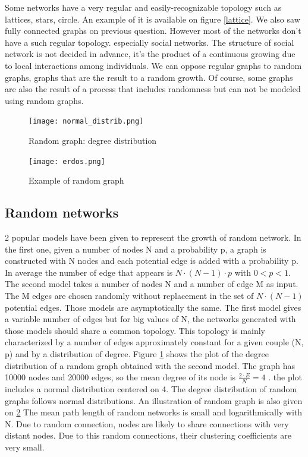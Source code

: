 \documentclass[a4paper, 12pt]{report}
\begin{document}
Some networks have a very regular and easily-recognizable topology such as lattices, stars, circle. An example of it is available on figure \ref{lattice}. We also saw fully connected graphs on previous question. However most of the networks don't have a such regular topology. especially social networks. The structure of social network is not decided in advance, it's the product of a continuous growing due to local interactions among individuals. We can oppose regular graphs to random graphs, graphs that are the result to a random growth. Of course, some graphs are also the result of a process that includes randomness but can not be modeled using random graphs.\\

\begin{figure}
\centering
\texttt{[image: normal\_distrib.png]}
\caption{Random graph: degree distribution}
\label{random}
\end{figure}

\begin{figure}
\centering
\texttt{[image: erdos.png]}
\caption{Example of random graph\citep{erdos_image}}
\label{erdos}
\end{figure}

\subsection{Random networks}
2 popular models have been given to represent the growth of random network. In the first one, given a number of nodes N and a probability p, a graph is constructed with N nodes and each potential edge is added with a probability p. In average the number of edge that appears is $N \cdot (N-1) \cdot p$ with $ 0< p <1$. The second model takes a number of nodes N and a number of edge M as input. The M edges are chosen randomly without replacement in the set of $N \cdot (N-1)$ potential edges. Those models are asymptotically the same. The first model gives a variable number of edges but for big values of N, the networks generated with those models should share a common topology. This topology is mainly characterized by a number of edges approximately constant for a given couple (N, p) and by a distribution of degree. Figure \ref{random} shows the plot of the degree distribution of a random graph obtained with the second model. The graph has 10000 nodes and 20000 edges, so the mean degree of its node is  $\frac{2 \cdot E}{N} = 4$ . the plot includes a normal distribution centered on 4. The degree distribution of random graphs follows normal distributions.  An illustration of random graph is also given on \ref{erdos} The mean path length of random networks is small and  logarithmically with N. Due to random connection, nodes are likely to share connections with very distant nodes. Due to this random connections, their clustering coefficients are very small.\\
\end{document}

